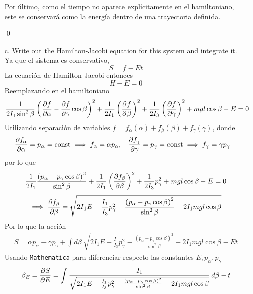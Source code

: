 \documentclass[]{article}
\numberwithin{equation}{section}
\begin{document}
\begin{enumerate}
	Por último, como el tiempo no aparece explícitamente en el hamiltoniano, este se conservará como la energía dentro de una trayectoria definida.
	
	\qed
	
	\item[c.] Write out the Hamilton-Jacobi equation for this system and integrate it.
	\resp Ya que el sistema es conservativo,
	\begin{equation}
		S = f - E t
	\end{equation}
	La ecuación de Hamilton-Jacobi entonces
	\begin{equation}
		H - E = 0
	\end{equation}
	Reemplazando en el hamiltoniano
	\begin{equation*}
		\frac{1}{2 I_1 \sin^2\beta} \left(\dfrac{\partial f}{\partial \alpha} - \dfrac{\partial f}{\partial \gamma} \cos\beta\right)^2 + \frac{1}{2 I_1} \left(\dfrac{\partial f}{\partial \beta}\right)^2 + \frac{1}{2 I_3} \left(\dfrac{\partial f}{\partial \gamma}\right)^2 + m g l\cos\beta - E = 0
	\end{equation*}
	Utilizando separación de variables $f = f_\alpha(\alpha) + f_\beta(\beta) + f_\gamma(\gamma)$, donde
	\begin{align}
		\dfrac{\partial f_\alpha}{\partial \alpha} &= p_\alpha = \mathrm{const} \implies f_\alpha = \alpha p_\alpha, & \dfrac{\partial f_\gamma}{\partial \gamma} &= p_\gamma = \mathrm{const} \implies f_\gamma = \gamma p_\gamma
	\end{align}
	por lo que
	\begin{equation*}
		\frac{1}{2 I_1} \frac{\left(p_\alpha - p_\gamma \cos\beta\right)^2}{\sin^2\beta} + \frac{1}{2 I_1} \left(\dfrac{\partial f_\beta}{\partial \beta}\right)^2 + \frac{1}{2 I_3} p_\gamma^2 + m g l\cos\beta - E = 0
	\end{equation*}
	\begin{align*}
		\implies \dfrac{\partial f_\beta}{\partial \beta} = \sqrt{2 I_1 E - \frac{I_1}{I_3} p_\gamma^2 - \frac{\left(p_\alpha - p_\gamma \cos\beta\right)^2}{\sin^2\beta} - 2 I_1 m g l\cos\beta }
	\end{align*}
	Por lo que la acción
	\begin{align}
		S = \alpha p_\alpha + \gamma p_\gamma + \int d\beta \, \sqrt{2 I_1 E - \frac{I_1}{I_3} p_\gamma^2 - \frac{\left(p_\alpha - p_\gamma \cos\beta\right)^2}{\sin^2\beta} - 2 I_1 m g l\cos\beta } - E t
	\end{align}
	Usando \texttt{Mathematica} para diferenciar respecto las constantes $E, p_\alpha, p_\gamma$
	\begin{align}
		\beta_E = \pd{S}{E} &= \int \frac{I_1}{\sqrt{2 I_1 E - \frac{I_1}{I_3} p_\gamma^2 - \frac{\left(p_\alpha - p_\gamma \cos\beta\right)^2}{\sin^2\beta} - 2 I_1 m g l\cos\beta }} \, d\beta - t\\

\end{align}
\end{enumerate}
\end{document}

